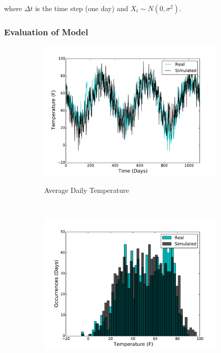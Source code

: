 \documentclass[11pt, letterpaper]{article}
\begin{document}
where $\Delta t$ is the time step (one day) and $X_t \sim N(0, \sigma^2)$.

\subsubsection{Evaluation of Model}

\begin{figure}[H]
  \centering
  \begin{subfigure}[b]{0.45\textwidth}
    \includegraphics[width=\textwidth]{figures/sim_temp.pdf}
    \label{fig:analysis-raw}
    \caption{Average Daily Temperature}
  \end{subfigure}
  ~
  \begin{subfigure}[b]{0.45\textwidth}
    \includegraphics[width=\textwidth]{figures/sim_temp_hist.pdf}

\end{subfigure}
\end{figure}
\end{document}
